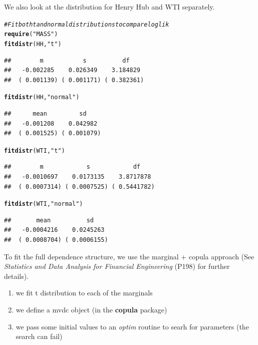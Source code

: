 \documentclass[10pt]{article}\usepackage[]{graphicx}\usepackage[]{color}
\makeatletter
\newcommand{\hlstr}[1]{\textcolor[rgb]{0.192,0.494,0.8}{#1}}%
\newcommand{\hlcom}[1]{\textcolor[rgb]{0.678,0.584,0.686}{\textit{#1}}}%
\newcommand{\hlstd}[1]{\textcolor[rgb]{0.345,0.345,0.345}{#1}}%
\newcommand{\hlkwd}[1]{\textcolor[rgb]{0.737,0.353,0.396}{\textbf{#1}}}%
\newenvironment{kframe}{%
 \def\at@end@of@kframe{}%
 \ifinner\ifhmode%
  \def\at@end@of@kframe{\end{minipage}}%
  \begin{minipage}{\columnwidth}%
 \fi\fi%
 \def\FrameCommand##1{\hskip\@totalleftmargin \hskip-\fboxsep
 \colorbox{shadecolor}{##1}\hskip-\fboxsep
     \hskip-\linewidth \hskip-\@totalleftmargin \hskip\columnwidth}%
 \MakeFramed {\advance\hsize-\width
   \@totalleftmargin\z@ \linewidth\hsize
   \@setminipage}}%
 {\par\unskip\endMakeFramed%
 \at@end@of@kframe}
\newenvironment{knitrout}{}{} %
\makeatother
\begin{document}
We also look at the distribution for Henry Hub and WTI separately.
\begin{knitrout}
\color{fgcolor}\begin{kframe}
\begin{alltt}
\hlcom{# Fit both t and normal distributions to compare loglik}
\hlkwd{require}\hlstd{(}\hlstr{"MASS"}\hlstd{)}
\hlkwd{fitdistr}\hlstd{(HH,} \hlstr{"t"}\hlstd{)}
\end{alltt}
\begin{verbatim}
##        m           s          df    
##   -0.002285    0.026349    3.184829 
##  ( 0.001139) ( 0.001171) ( 0.382361)
\end{verbatim}
\begin{alltt}
\hlkwd{fitdistr}\hlstd{(HH,} \hlstr{"normal"}\hlstd{)}
\end{alltt}
\begin{verbatim}
##      mean         sd    
##   -0.001208    0.042982 
##  ( 0.001525) ( 0.001079)
\end{verbatim}
\begin{alltt}
\hlkwd{fitdistr}\hlstd{(WTI,} \hlstr{"t"}\hlstd{)}
\end{alltt}
\begin{verbatim}
##        m            s            df    
##   -0.0010697    0.0173135    3.8717878 
##  ( 0.0007314) ( 0.0007525) ( 0.5441782)
\end{verbatim}
\begin{alltt}
\hlkwd{fitdistr}\hlstd{(WTI,} \hlstr{"normal"}\hlstd{)}
\end{alltt}
\begin{verbatim}
##       mean          sd    
##   -0.0004216    0.0245263 
##  ( 0.0008704) ( 0.0006155)
\end{verbatim}
\end{kframe}
\end{knitrout}

To fit the full dependence structure, we use the marginal + copula approach (See \textit{Statistics and Data Analysis for Financial Engineering} (P198) for further details).
\begin{enumerate}
\item we fit t distribution to each of the marginals
\item we define a mvdc object (in the \textbf{copula} package)
\item we pass some initial values to an \textit{optim} routine to searh for parameters (the search can fail)  
\end{enumerate}
\end{document}
